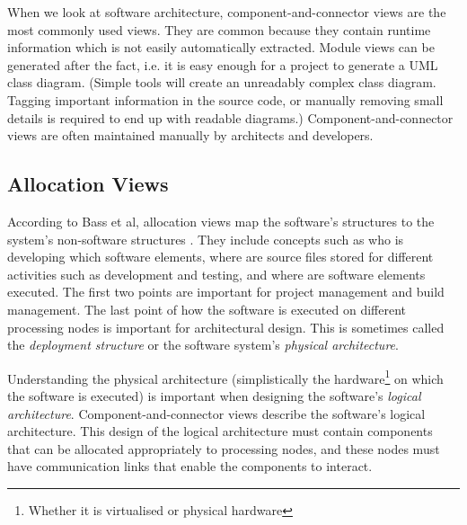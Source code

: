 When we look at software architecture, component-and-connector views are the most commonly used views.
They are common because they contain runtime information which is not easily automatically extracted.
Module views can be generated after the fact, i.e. it is easy enough for a project to generate a UML class diagram.
(Simple tools will create an unreadably complex class diagram.
Tagging important information in the source code, or manually removing small details is required to end up with readable diagrams.)
Component-and-connector views are often maintained manually by architects and developers.

\subsection{Allocation Views}
According to Bass et al, allocation views map the software's structures to the system's non-software structures \cite{bass2021software}.
They include concepts such as who is developing which software elements,
where are source files stored for different activities such as development and testing,
and where are software elements executed.
The first two points are important for project management and build management.
The last point of how the software is executed on different processing nodes is important for architectural design.
This is sometimes called the \emph{deployment structure} or the software system's \emph{physical architecture}.

Understanding the physical architecture (simplistically the hardware\footnote{Whether it is virtualised or physical hardware}
on which the software is executed) is important when designing the software's \emph{logical architecture}.
Component-and-connector views describe the software's logical architecture.
This design of the logical architecture must contain components that can be allocated appropriately to processing nodes,
and these nodes must have communication links that enable the components to interact.


